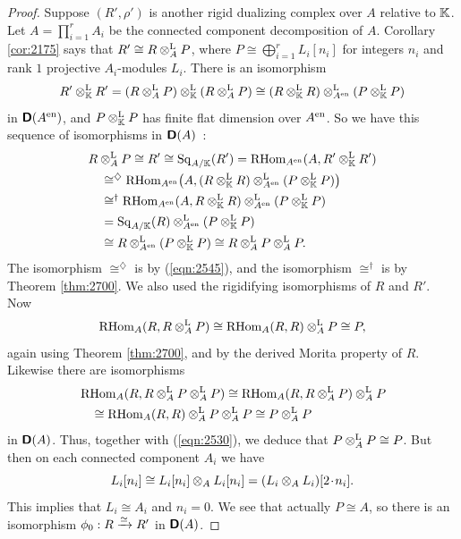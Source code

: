 \begin{proof}
Suppose $(R', \rho')$ is another rigid dualizing 
complex over $A$ relative to $\mathbb{K}$. Let 
$A = \prod_{i = 1}^r A_i$ be the connected component decomposition of $A$. 
Corollary \ref{cor:2175} says that 
$R' \cong R \otimes^{\mathrm{L}}_A P$,
where 
$P \cong \bigoplus_{i = 1}^r L_i[n_i]$
for integers $n_i$ and rank $1$ projective $A_i$-modules $L_i$. 
There is an isomorphism 
\begin{equation} \label{eqn:2545}
R' \otimes^{\mathrm{L}}_{\mathbb{K}} R' = 
(R \otimes^{\mathrm{L}}_A P) \otimes^{\mathrm{L}}_{\mathbb{K}} (R \otimes^{\mathrm{L}}_A P) \cong 
(R \otimes^{\mathrm{L}}_{\mathbb{K}} R) \otimes^{\mathrm{L}}_{A^{\mathrm{en}}}
(P \otimes^{\mathrm{L}}_{\mathbb{K}} P) 
\end{equation}
in $\boldsymbol{\mathsf{D}}(A^{\mathrm{en}})$, and 
$P \otimes^{\mathrm{L}}_{\mathbb{K}} P$
has finite flat dimension over $A^{\mathrm{en}}$. 
So we have this sequence of isomorphisms in $\boldsymbol{\mathsf{D}}(A)$~:
\begin{equation} \label{eqn:2530}
\begin{aligned}
& R \otimes^{\mathrm{L}}_A P \cong R' \cong \operatorname{Sq}_{A / \mathbb{K}}(R')
=  \mathrm{RHom}_{A^{\mathrm{en}}}(A, R' \otimes^{\mathrm{L}}_{\mathbb{K}} R') 
\\
& \quad 
\cong^{\diamondsuit} 
\mathrm{RHom}_{A^{\mathrm{en}}}
\bigl( A, (R \otimes^{\mathrm{L}}_{\mathbb{K}} R) \otimes^{\mathrm{L}}_{A^{\mathrm{en}}}
(P \otimes^{\mathrm{L}}_{\mathbb{K}} P) \bigr) 
\\
& \quad 
\cong^{\dag} \mathrm{RHom}_{A^{\mathrm{en}}}(A, R \otimes^{\mathrm{L}}_{\mathbb{K}} R) 
\otimes^{\mathrm{L}}_{A^{\mathrm{en}}} (P \otimes^{\mathrm{L}}_{\mathbb{K}} P)
\\
& \quad 
= \operatorname{Sq}_{A / \mathbb{K}}(R) 
\otimes^{\mathrm{L}}_{A^{\mathrm{en}}} (P \otimes^{\mathrm{L}}_{\mathbb{K}} P)
\\
& \quad 
\cong R \otimes^{\mathrm{L}}_{A^{\mathrm{en}}} (P \otimes^{\mathrm{L}}_{\mathbb{K}} P)
\cong R \otimes^{\mathrm{L}}_A P  \otimes^{\mathrm{L}}_A P .
\end{aligned}
\end{equation}
The isomorphism $\cong^{\diamondsuit}$ is by (\ref{eqn:2545}), and the 
isomorphism $\cong^{\dag}$ is by Theorem \ref{thm:2700}.
We also used the rigidifying isomorphisms of $R$ and $R'$. Now 
\[ \operatorname{RHom}_{A}(R, R \otimes^{\mathrm{L}}_A P) \cong 
\operatorname{RHom}_{A}(R, R) \otimes^{\mathrm{L}}_A P \cong P , \]
again using Theorem \ref{thm:2700}, and by the derived Morita property of 
$R$. Likewise there are isomorphisms
\[ \begin{aligned}
& 
\operatorname{RHom}_{A}(R, R \otimes^{\mathrm{L}}_A P \otimes^{\mathrm{L}}_A P) \cong 
\operatorname{RHom}_{A}(R, R \otimes^{\mathrm{L}}_A P) \otimes^{\mathrm{L}}_A P
\\
& \quad
\cong \operatorname{RHom}_{A}(R, R) \otimes^{\mathrm{L}}_A P \otimes^{\mathrm{L}}_A P
\cong P \otimes^{\mathrm{L}}_A P 
\end{aligned} \]
in $\boldsymbol{\mathsf{D}}(A)$.
Thus, together with (\ref{eqn:2530}), we deduce that 
$P \otimes^{\mathrm{L}}_A P \cong P$. 
But then on each connected component $A_i$ we have 
\[ L_i[n_i] \cong L_i[n_i] \otimes_A L_i[n_i]  = 
(L_i \otimes_A L_i)[2 \mspace{1.5mu}{\cdot}\mspace{1.5mu} n_i] . \]
This implies that $L_i \cong A_i$ and $n_i = 0$. 
We see that actually $P \cong A$, so there is an isomorphism 
$\phi_0 : R \xrightarrow{\simeq} R'$ in $\boldsymbol{\mathsf{D}}(A)$. 


\end{proof}
